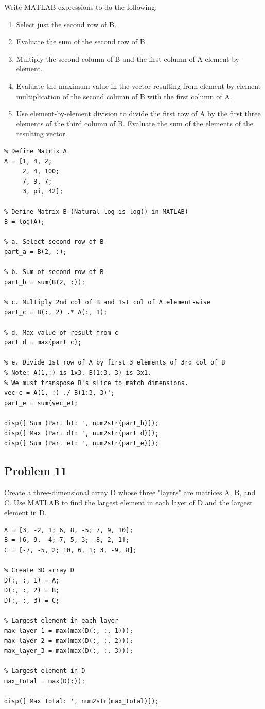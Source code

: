 \documentclass[DIN, pagenumber=false, fontsize=11pt, parskip=half]{scrartcl}
\newcommand{\myproblem}[1]{\subsection*{#1}}
\begin{document}
Write MATLAB expressions to do the following:
\begin{enumerate}
    \item[a.] Select just the second row of B.
    \item[b.] Evaluate the sum of the second row of B.
    \item[c.] Multiply the second column of B and the first column of A element by element.
    \item[d.] Evaluate the maximum value in the vector resulting from element-by-element multiplication of the second column of B with the first column of A.
    \item[e.] Use element-by-element division to divide the first row of A by the first three elements of the third column of B. Evaluate the sum of the elements of the resulting vector.
\end{enumerate}

\begin{lstlisting}
% Define Matrix A
A = [1, 4, 2;
     2, 4, 100;
     7, 9, 7;
     3, pi, 42];

% Define Matrix B (Natural log is log() in MATLAB)
B = log(A);

% a. Select second row of B
part_a = B(2, :);

% b. Sum of second row of B
part_b = sum(B(2, :));

% c. Multiply 2nd col of B and 1st col of A element-wise
part_c = B(:, 2) .* A(:, 1);

% d. Max value of result from c
part_d = max(part_c);

% e. Divide 1st row of A by first 3 elements of 3rd col of B
% Note: A(1,:) is 1x3. B(1:3, 3) is 3x1. 
% We must transpose B's slice to match dimensions.
vec_e = A(1, :) ./ B(1:3, 3)'; 
part_e = sum(vec_e);

disp(['Sum (Part b): ', num2str(part_b)]);
disp(['Max (Part d): ', num2str(part_d)]);
disp(['Sum (Part e): ', num2str(part_e)]);
\end{lstlisting}

\myproblem{Problem 11}
Create a three-dimensional array D whose three "layers" are matrices A, B, and C. Use MATLAB to find the largest element in each layer of D and the largest element in D.

\begin{lstlisting}
A = [3, -2, 1; 6, 8, -5; 7, 9, 10];
B = [6, 9, -4; 7, 5, 3; -8, 2, 1];
C = [-7, -5, 2; 10, 6, 1; 3, -9, 8];

% Create 3D array D
D(:, :, 1) = A;
D(:, :, 2) = B;
D(:, :, 3) = C;

% Largest element in each layer
max_layer_1 = max(max(D(:, :, 1)));
max_layer_2 = max(max(D(:, :, 2)));
max_layer_3 = max(max(D(:, :, 3)));

% Largest element in D
max_total = max(D(:));

disp(['Max Total: ', num2str(max_total)]);
\end{lstlisting}
\end{document}
